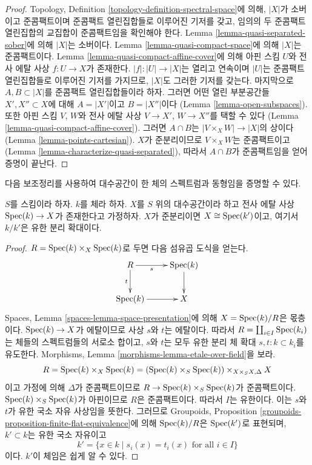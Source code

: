 \begin{proof}
Topology, Definition \ref{topology-definition-spectral-space}에 의해,
$|X|$가 소버이고 준콤팩트이며 준콤팩트 열린집합들로 이루어진 기저를
갖고, 임의의 두 준콤팩트 열린집합의 교집합이 준콤팩트임을 확인해야 한다.
Lemma \ref{lemma-quasi-separated-sober}에 의해 $|X|$는 소버이다.
Lemma \ref{lemma-quasi-compact-space}에 의해 $|X|$는 준콤팩트이다.
Lemma \ref{lemma-quasi-compact-affine-cover}에 의해 아핀 스킴 $U$와
전사 에탈 사상 $f : U \to X$가 존재한다.
$|f| : |U| \to |X|$는 열리고 연속이며 $|U|$는 준콤팩트 열린집합들로
이루어진 기저를 가지므로, $|X|$도 그러한 기저를 갖는다. 마지막으로
$A, B \subset |X|$를 준콤팩트 열린집합들이라 하자. 그러면 어떤 열린
부분공간들 $X', X'' \subset X$에 대해 $A = |X'|$이고 $B = |X''|$이다
(Lemma \ref{lemma-open-subspaces}). 또한 아핀 스킴 $V$, $W$와 전사 에탈
사상 $V \to X'$, $W \to X''$를 택할 수 있다
(Lemma \ref{lemma-quasi-compact-affine-cover}). 그러면 $A \cap B$는
$|V \times_X W| \to |X|$의 상이다(Lemma
\ref{lemma-points-cartesian}). $X$가 준분리이므로
$V \times_X W$는 준콤팩트이고(Lemma
\ref{lemma-characterize-quasi-separated}), 따라서 $A \cap B$가
준콤팩트임을 얻어 증명이 끝난다.
\end{proof}

\noindent
다음 보조정리를 사용하여 대수공간이 한 체의 스펙트럼과 동형임을
증명할 수 있다.

\begin{lemma}
\label{lemma-point-like-spaces}
$S$를 스킴이라 하자. $k$를 체라 하자.
$X$를 $S$ 위의 대수공간이라 하고 전사 에탈 사상
$\mathop{\mathrm{Spec}}(k) \to X$가 존재한다고 가정하자.
$X$가 준분리이면 $X \cong \mathop{\mathrm{Spec}}(k')$이고, 여기서 $k/k'$은 유한 분리
확대이다.
\end{lemma}

\begin{proof}
$R = \mathop{\mathrm{Spec}}(k) \times_X \mathop{\mathrm{Spec}}(k)$로 두면 다음 섬유곱 도식을 얻는다.
$$
\xymatrix{
R \ar[r]_-s \ar[d]_-t & \Spec(k) \ar[d] \\
\Spec(k) \ar[r] & X
}
$$
Spaces, Lemma \ref{spaces-lemma-space-presentation}에 의해
$X = \mathop{\mathrm{Spec}}(k)/R$은 몫층이다. $\mathop{\mathrm{Spec}}(k) \to X$가 에탈이므로 사상
$s$와 $t$는 에탈이다. 따라서
$R = \coprod_{i \in I} \mathop{\mathrm{Spec}}(k_i)$는 체들의 스펙트럼들의 서로소 합이고,
$s$와 $t$는 모두 유한 분리 체 확대 $s, t : k \subset k_i$를 유도한다.
Morphisms, Lemma \ref{morphisms-lemma-etale-over-field}을 보라.
$$
R = \mathop{\mathrm{Spec}}(k) \times_X \mathop{\mathrm{Spec}}(k)
= (\mathop{\mathrm{Spec}}(k) \times_S \mathop{\mathrm{Spec}}(k)) \times_{X \times_S X, \Delta} X
$$
이고 가정에 의해 $\Delta$가 준콤팩트이므로
$R \to \mathop{\mathrm{Spec}}(k) \times_S \mathop{\mathrm{Spec}}(k)$가 준콤팩트이다.
$\mathop{\mathrm{Spec}}(k) \times_S \mathop{\mathrm{Spec}}(k)$가 아핀이므로 $R$은 준콤팩트이다.
따라서 $I$는 유한이다. 이는 $s$와 $t$가 유한 국소 자유 사상임을
뜻한다. 그러므로 Groupoids, Proposition
\ref{groupoids-proposition-finite-flat-equivalence}에 의해
$\mathop{\mathrm{Spec}}(k)/R$은 $\mathop{\mathrm{Spec}}(k')$로 표현되며, $k' \subset k$는 유한 국소
자유이고
$$
k' = \{x \in k \mid s_i(x) = t_i(x)\text{ for all }i \in I\}
$$
이다. $k'$이 체임은 쉽게 알 수 있다.
\end{proof}

